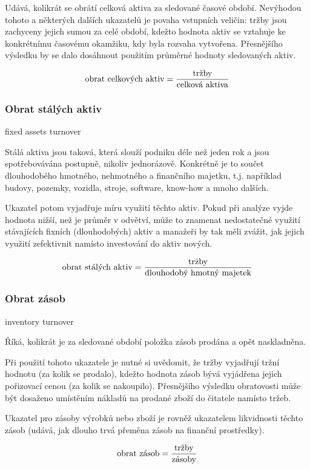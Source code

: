 Udává, kolikrát se obrátí celková aktiva za sledované časové období. Nevýhodou tohoto a některých dalších ukazatelů je povaha vstupních veličin: tržby jsou zachyceny jejich sumou za celé období, kdežto hodnota aktiv se vztahuje ke konkrétnímu časovému okamžiku, kdy byla rozvaha vytvořena. Přesnějšího výsledku by se dalo dosáhnout použitím průměrné hodnoty sledovaných aktiv. 

$$\text{obrat celkových aktiv} = \dfrac{\text{tržby}}{\text{celková aktiva}}$$

\subsubsection{Obrat stálých aktiv}
fixed assets turnover

Stálá aktiva jsou taková, která slouží podniku déle než jeden rok a jsou spotřebovávána postupně, nikoliv jednorázově. Konkrétně je to součet dlouhodobého hmotného, nehmotného a finančního majetku, t.j. například budovy, pozemky, vozidla, stroje, software, know-how a mnoho dalších.

Ukazatel potom vyjadřuje míru využití těchto aktiv. Pokud při analýze vyjde hodnota nižší, než je průměr v odvětví, může to znamenat nedostatečné využití stávajících fixních (dlouhodobých) aktiv a manažeři by tak měli zvážit, jak jejich využití zefektivnit namísto investování do aktiv nových.

$$\text{obrat stálých aktiv} = \dfrac{\text{tržby}}{\text{dlouhodobý hmotný majetek}}$$

\subsubsection{Obrat zásob}
inventory turnover

Říká, kolikrát je za sledované období položka zásob prodána a opět naskladněna.

Při použití tohoto ukazatele je nutné si uvědomit, že tržby vyjadřují tržní hodnotu (za kolik se prodalo), kdežto hodnota zásob bývá vyjádřena jejich pořizovací cenou (za kolik se nakoupilo). Přesnějšího výsledku obratovosti může být dosaženo umístěním nákladů na prodané zboží do čitatele namísto tržeb.

Ukazatel pro zásoby výrobků nebo zboží je rovněž ukazatelem likvidnosti těchto zásob (udává, jak dlouho trvá přeměna zásob na finanční prostředky).

$$\text{obrat zásob} = \dfrac{\text{tržby}}{\text{zásoby}}$$


